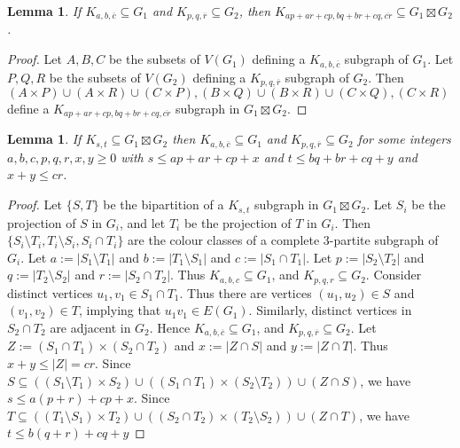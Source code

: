 \documentclass[a4paper,11pt]{article}
\theoremstyle{plain}
\newtheorem{lem}[thm]{Lemma}
\theoremstyle{definition}
\renewcommand{\leq}{\leqslant}
\renewcommand{\geq}{\geqslant}
\begin{document}
\begin{lem}
	\label{CompleteBipartiteStrongProductLowerBound}
	If $K_{a,b,\overline{c}}\subseteq G_1$ and $K_{p,q,\overline{r}}\subseteq G_2$, then 
	$K_{ap+ar+cp, bq+br+cq,\overline{cr}} \subseteq  G_1\boxtimes G_2$. 
\end{lem}

\begin{proof}
	Let $A,B,C$ be the subsets of $V(G_1)$ defining a $K_{a,b,\overline{c}}$ subgraph of $G_1$. 
	Let $P,Q,R$ be the subsets of $V(G_2)$ defining a $K_{p,q,\overline{r}}$ subgraph of $G_2$. 
	Then $(A\times P)\cup(A\times R)\cup(C\times P),(B\times Q)\cup(B\times R)\cup(C\times Q),(C\times R)$ define a $K_{ap+ar+cp, bq+br+cq,\overline{cr}}$ subgraph in $G_1\boxtimes G_2$. 	
\end{proof}


\begin{lem}
\label{CompleteBipartiteStrongProductUpperBound}
If $K_{s,t} \subseteq G_1\boxtimes G_2$ then $K_{a,b,\overline{c}}\subseteq G_1$ and $K_{p,q,\overline{r}}\subseteq G_2$ for some integers $a,b,c,p,q,r,x,y\geq 0$ with $s\leq ap+ar+cp +x$ and $t\leq bq+br+cq+y$ and $x+y\leq cr$. 
\end{lem}


\begin{proof}
	Let $\{S,T\}$ be the  bipartition of a $K_{s,t}$ subgraph in $G_1\boxtimes G_2$. 
	Let $S_i$ be the projection of $S$ in $G_i$, and let $T_i$ be the projection of $T$ in $G_i$. 
	Then $\{S_i\setminus T_i,T_i\setminus S_i,S_i\cap T_i\}$ are the colour classes of a complete 3-partite subgraph of $G_i$. 
	Let $a:=|S_1\setminus T_1|$ and $b:= |T_1\setminus S_1|$ and $c:= |S_1\cap T_1|$. 
	Let $p:=|S_2\setminus T_2|$ and $q:= |T_2\setminus S_2|$ and $r:= |S_2\cap T_2|$. 
	Thus $K_{a,b,c}\subseteq G_1$, and $K_{p,q,r}\subseteq G_2$. 
	Consider distinct vertices $u_1,v_1\in S_1\cap T_1$. Thus there are vertices $(u_1,u_2)\in S$ and $(v_1,v_2)\in T$, implying that $u_1v_1\in E(G_1)$. Similarly, distinct vertices in $S_2\cap T_2$ are adjacent in $G_2$. 
	Hence $K_{a,b,\overline{c}}\subseteq G_1$, and $K_{p,q,\overline{r}}\subseteq G_2$. 
	Let $Z:= (S_1\cap T_1) \times (S_2\cap T_2)$ and $x:=|Z \cap S|$ and $y:= |Z\cap T|$. 
	Thus $x+y \leq |Z| = cr$. 
	Since $S\subseteq ( (S_1\setminus T_1 )\times S_2) \cup ( (S_1\cap T_1) \times (S_2\setminus T_2) ) \cup (Z\cap S)$, we have 
	$s\leq a(p+r) +cp +x$. 
	Since $T\subseteq ( (T_1\setminus S_1 )\times T_2 )\cup ( (S_2\cap T_2) \times (T_2\setminus S_2)) \cup (Z\cap T)$, we have 
	$t\leq b(q+r) +cq+y$
\end{proof}
\end{document}
